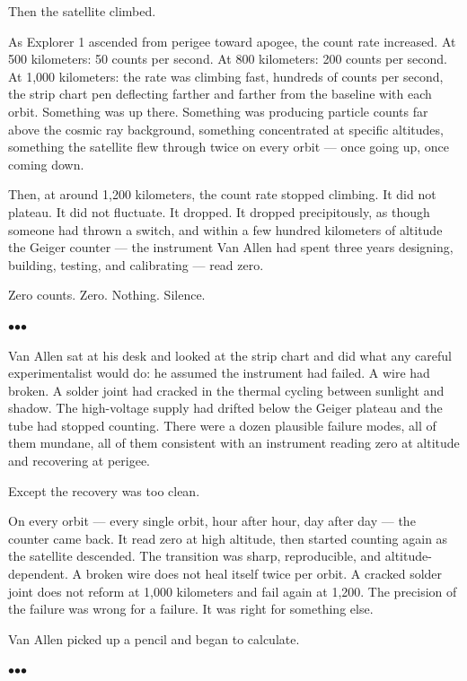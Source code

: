 \documentclass[12pt, letterpaper]{article}
\begin{document}
Then the satellite climbed.

As Explorer 1 ascended from perigee toward apogee, the count rate increased. At 500 kilometers: 50 counts per second. At 800 kilometers: 200 counts per second. At 1,000 kilometers: the rate was climbing fast, hundreds of counts per second, the strip chart pen deflecting farther and farther from the baseline with each orbit. Something was up there. Something was producing particle counts far above the cosmic ray background, something concentrated at specific altitudes, something the satellite flew through twice on every orbit --- once going up, once coming down.

Then, at around 1,200 kilometers, the count rate stopped climbing. It did not plateau. It did not fluctuate. It dropped. It dropped precipitously, as though someone had thrown a switch, and within a few hundred kilometers of altitude the Geiger counter --- the instrument Van Allen had spent three years designing, building, testing, and calibrating --- read zero.

Zero counts. Zero. Nothing. Silence.

\bigskip
\centerline{$\bullet$\quad$\bullet$\quad$\bullet$}
\bigskip

Van Allen sat at his desk and looked at the strip chart and did what any careful experimentalist would do: he assumed the instrument had failed. A wire had broken. A solder joint had cracked in the thermal cycling between sunlight and shadow. The high-voltage supply had drifted below the Geiger plateau and the tube had stopped counting. There were a dozen plausible failure modes, all of them mundane, all of them consistent with an instrument reading zero at altitude and recovering at perigee.

Except the recovery was too clean.

On every orbit --- every single orbit, hour after hour, day after day --- the counter came back. It read zero at high altitude, then started counting again as the satellite descended. The transition was sharp, reproducible, and altitude-dependent. A broken wire does not heal itself twice per orbit. A cracked solder joint does not reform at 1,000 kilometers and fail again at 1,200. The precision of the failure was wrong for a failure. It was right for something else.

Van Allen picked up a pencil and began to calculate.

\bigskip
\centerline{$\bullet$\quad$\bullet$\quad$\bullet$}
\bigskip
\end{document}
